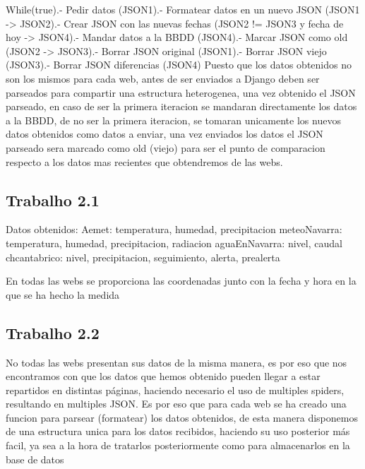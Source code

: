 While(true).- Pedir datos (JSON1).- Formatear datos en un nuevo JSON (JSON1 -> JSON2).- Crear JSON con las nuevas fechas (JSON2 != JSON3 y fecha de hoy -> JSON4).- Mandar datos a la BBDD (JSON4).- Marcar JSON como old (JSON2 -> JSON3).- Borrar JSON original (JSON1).- Borrar JSON viejo (JSON3).- Borrar JSON diferencias (JSON4)\newline
\newline
\newline
Puesto que los datos obtenidos no son los mismos para cada web, antes de ser enviados a Django deben ser parseados para compartir una estructura heterogenea, una vez obtenido el JSON parseado, en caso de ser la primera iteracion se mandaran directamente los datos a la BBDD, de no ser la primera iteracion, se tomaran unicamente los nuevos datos obtenidos como datos a enviar, una vez enviados los datos el JSON parseado sera marcado como old (viejo) para ser el punto de comparacion respecto a los datos mas recientes que obtendremos de las webs.

\subsection{Trabalho 2.1}
Datos obtenidos:\newline
Aemet:\newline
temperatura, humedad, precipitacion
\newline
meteoNavarra:\newline
temperatura, humedad, precipitacion, radiacion
\newline
aguaEnNavarra:\newline
nivel, caudal
\newline
chcantabrico:\newline
nivel, precipitacion, seguimiento, alerta, prealerta

En todas las webs se proporciona las coordenadas junto con la fecha y hora en la que se ha hecho la medida

\subsection{Trabalho 2.2}
No todas las webs presentan sus datos de la misma manera, es por eso que nos encontramos con que los datos que hemos obtenido pueden llegar a estar repartidos en distintas páginas, haciendo necesario el uso de multiples spiders, resultando en multiples JSON.
Es por eso que para cada web se ha creado una funcion para parsear (formatear) los datos obtenidos, de esta manera disponemos de una estructura unica para los datos recibidos, haciendo su uso posterior más facil, ya sea a la hora de tratarlos posteriormente como para almacenarlos en la base de datos

